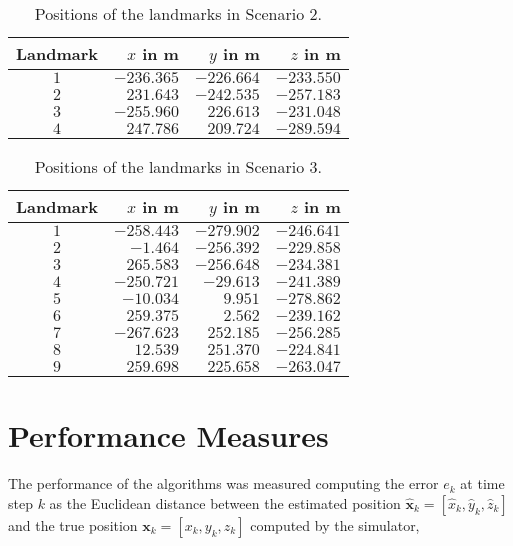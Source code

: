 \begin{table*}\centering
{}
\begin{tabular}{@{}crrr@{}}\toprule
Landmark & $x$ in m & $y$ in m & $z$ in m \\
\midrule 
$1$ & $-236.365$ & $-226.664$ & $-233.550$ \\             
$2$ & $231.643$ & $-242.535$ & $-257.183$ \\              
$3$ & $-255.960$ & $226.613$ & $-231.048$ \\              
$4$ & $247.786$ & $209.724$ & $-289.594$ \\ 
\bottomrule
\end{tabular}
\caption{Positions of the landmarks in Scenario 2.}
\label{tab:4landmarks}
\end{table*}

\begin{table*}\centering
{}
\begin{tabular}{@{}crrr@{}}\toprule
Landmark & $x$ in m & $y$ in m & $z$ in m \\
\midrule 
$1$ & $-258.443$ & $-279.902$ & $-246.641$ \\             
$2$ & $-1.464$ & $-256.392$ & $-229.858$ \\               
$3$ & $265.583$ & $-256.648$ & $-234.381$ \\              
$4$ & $-250.721$ & $-29.613$ & $-241.389$ \\              
$5$ & $-10.034$ & $9.951$ & $-278.862$ \\                 
$6$ & $259.375$ & $2.562$ & $-239.162$ \\                 
$7$ & $-267.623$ & $252.185$ & $-256.285$ \\              
$8$ & $12.539$ & $251.370$ & $-224.841$ \\                
$9$ & $259.698$ & $225.658$ & $-263.047$ \\    
\bottomrule
\end{tabular}
\caption{Positions of the landmarks in Scenario 3.}
\label{tab:9landmarks}
\end{table*}


\section{Performance Measures}\label{performance_measures}

The performance of the algorithms was measured computing the error $e_k$ at time step $k$ as the Euclidean distance between the estimated position $\hat{\bm{x}}_k = [\hat{x}_k, \hat{y}_k, \hat{z}_k]$ and the true position $\bm{x}_k = [x_k, y_k, z_k]$ computed by the simulator,

